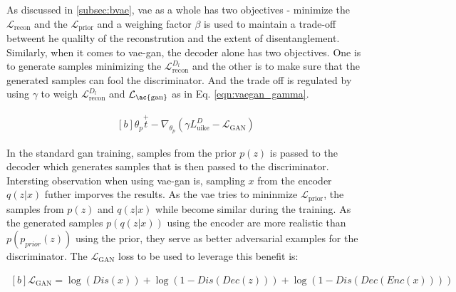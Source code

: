 As discussed in \ref{subsec:bvae}, \ac{vae} as a whole has two objectives - minimize the $\mathcal{L}_{\text {recon}}$ and the $\mathcal{L}_{\text {prior}}$ and a weighing factor $\beta$ is used to maintain a trade-off betweent he qualilty of the reconstrution and the extent of disentanglement. Similarly, when it comes to \ac{vae}-\ac{gan}, the decoder alone has two objectives. One is to generate samples minimizing the $\mathcal{L}_{\text {recon}}^{D_{l}}$ and the other is to make sure that the generated samples can fool the discriminator. And the trade off is regulated by using $\gamma$ to weigh $\mathcal{L}_{\text {recon}}^{D_{l}}$ and $\mathcal{L}_{\text {\ac{gan}}}$ as in Eq. \ref{eqn:vaegan_gamma}.
 
\begin{equation} \label{eqn:vaegan_gamma}
    \begin{gathered}[b]
        \theta_{p} \stackrel{+}{t}-\nabla_{\theta_{p}}\left(\gamma L_{\mathrm{uike}}^{D}-\mathcal{L}_{\mathrm{GAN}}\right)
    \end{gathered}
\end{equation}

In the standard \ac{gan} training, samples from the prior $p(z)$ is passed to the decoder which generates samples that is then passed to the discriminator. Intersting observation when using \ac{vae}-\ac{gan} is, sampling $x$ from the encoder $q(z|x)$ futher imporves the results. As the \ac{vae} tries to mininmize $\mathcal{L}_{\text{prior}}$, the samples from $p(z)$ and $q(z|x)$ while become similar during the training. As the generated samples $p(q(z|x))$ using the encoder are more realistic than $p(p_{prior}(z))$ using the prior, they serve as better adversarial examples for the discriminator. The $\mathcal{L}_{\mathrm{GAN}}$ loss to be used to leverage this benefit is: 



\begin{equation} \label{eqn:vaegan_ganloss}
    \begin{gathered}[b]
        \mathcal{L}_{\mathrm{GAN}}=\log (Dis(x))+\log (1-Dis(Dec(z)))+\log (1-Dis(Dec(Enc(x))))
    \end{gathered}
\end{equation}


% 



